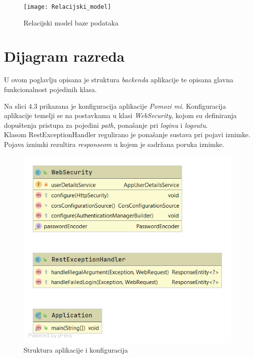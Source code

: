 			\begin{figure}[h]
				\texttt{[image: Relacijski\_model]}
				\caption{Relacijski model baze podataka}
			\end{figure}
			
			\eject

			
			
		\section{Dijagram razreda}
		
			U ovom poglavlju opisana je struktura \textit{backenda} aplikacije te opisana glavna funkcionalnost pojedinih klasa.\newline
			\newline
		
		
		
				Na slici 4.3 prikazana je konfiguracija aplikacije \textit{Pomozi mi}. Konfiguracija aplikacije temelji se na postavkama u klasi \textit{WebSecurity}, kojom su definiranja dopuštenja pristupa za pojedini \textit{path}, ponašanje pri \textit{loginu} i \textit{logoutu}. \\
				Klasom RestExceptionHandler regulirano je ponašanje sustava pri pojavi iznimke. Pojava iznimki rezultira \textit{responseom} u kojem je sadržana poruka iznimke.
				
				\begin{figure}[H]
					\includegraphics[scale=0.6]{slike/cs1.png} %
					\centering
					\caption{Struktura aplikacije i konfiguracija}
					
				\end{figure}
			

